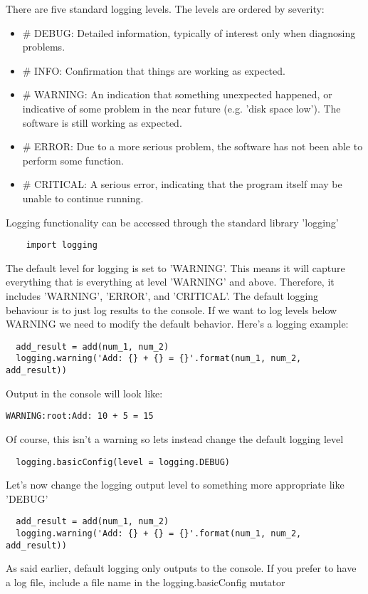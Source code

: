 \documentclass{article}%
\begin{document}
There are five standard logging levels. The levels are ordered by severity:
\begin{itemize}
  \item \# DEBUG: Detailed information, typically of interest only when diagnosing problems.
  \item \# INFO: Confirmation that things are working as expected.
  \item \# WARNING: An indication that something unexpected happened, or indicative of some problem in the near future (e.g. 'disk space low'). The software is still working as expected.
  \item \# ERROR: Due to a more serious problem, the software has not been able to perform some function.
  \item \# CRITICAL: A serious error, indicating that the program itself may be unable to continue running.
\end{itemize}
Logging functionality can be accessed through the standard library 'logging'
\begin{lstlisting}
    import logging
\end{lstlisting}
The default level for logging is set to 'WARNING'. This means it will capture everything that is everything at level 'WARNING' and above. Therefore, it includes 'WARNING', 'ERROR', and 'CRITICAL'. The default logging behaviour is to just log results to the console. If we want to log levels below WARNING we need to modify the default behavior.
Here's a logging example:
\begin{lstlisting}
  add_result = add(num_1, num_2)
  logging.warning('Add: {} + {} = {}'.format(num_1, num_2, add_result))
\end{lstlisting}
Output in the console will look like:
\begin{lstlisting}
WARNING:root:Add: 10 + 5 = 15
\end{lstlisting}
Of course, this isn't a warning so lets instead change the default logging level
\begin{lstlisting}
  logging.basicConfig(level = logging.DEBUG)
\end{lstlisting}
Let's now change the logging output level to something more appropriate like 'DEBUG'
\begin{lstlisting}
  add_result = add(num_1, num_2)
  logging.warning('Add: {} + {} = {}'.format(num_1, num_2, add_result))
\end{lstlisting}
As said earlier, default logging only outputs to the console. If you prefer to have a log file, include a file name in the logging.basicConfig mutator
\end{document}
